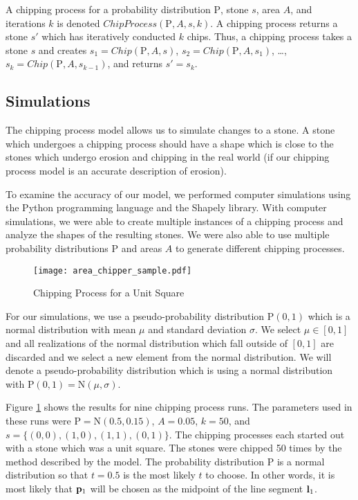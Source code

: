 \begin{definition}
A chipping process for a probability distribution $\mathrm{P}$, stone $s$, area $A$, and iterations $k$ is denoted $ChipProcess(\mathrm{P}, A, s, k)$. A chipping process returns a stone $s'$ which has iteratively conducted $k$ chips. Thus, a chipping process takes a stone $s$ and creates $s_1 = Chip(\mathrm{P}, A, s)$, $s_2 = Chip(\mathrm{P}, A, s_1)$, \ldots, $s_k = Chip(\mathrm{P}, A, s_{k-1})$, and returns $s' = s_k$.
\end{definition}

\subsection{Simulations}

The chipping process model allows us to simulate changes to a stone. A stone which undergoes a chipping process should have a shape which is close to the stones which undergo erosion and chipping in the real world (if our chipping process model is an accurate description of erosion).

To examine the accuracy of our model, we performed computer simulations using the Python programming language and the Shapely library. With computer simulations, we were able to create multiple instances of a chipping process and analyze the shapes of the resulting stones. We were also able to use multiple probability distributions $\mathrm{P}$ and areas $A$ to generate different chipping processes.

\begin{figure}
  \begin{center}
    \texttt{[image: area\_chipper\_sample.pdf]}
  \end{center}
  \caption{Chipping Process for a Unit Square \label{fig:area_chipper_sample}}
\end{figure}


For our simulations, we use a pseudo-probability distribution $\mathrm{P}(0,1)$ which is a normal distribution with mean $\mu$ and standard deviation $\sigma$. We select $\mu \in [0,1]$ and all realizations of the normal distribution which fall outside of $[0,1]$ are discarded and we select a new element from the normal distribution. We will denote a pseudo-probability distribution which is using a normal distribution with $\mathrm{P}(0,1) = \mathrm{N}(\mu, \sigma)$.

Figure \ref{fig:area_chipper_sample} shows the results for nine chipping process runs. The parameters used in these runs were $\mathrm{P} = \mathrm{N}(0.5, 0.15)$, $A = 0.05$, $k = 50$, and $s = \{(0,0), (1,0), (1,1), (0,1)\}$. The chipping processes each started out with a stone which was a unit square. The stones were chipped 50 times by the method described by the model. The probability distribution $\mathrm{P}$ is a normal distribution so that $t = 0.5$ is the most likely $t$ to choose. In other words, it is most likely that $\mathbf{p}_1$ will be chosen as the midpoint of the line segment $\mathbf{l}_1$.

